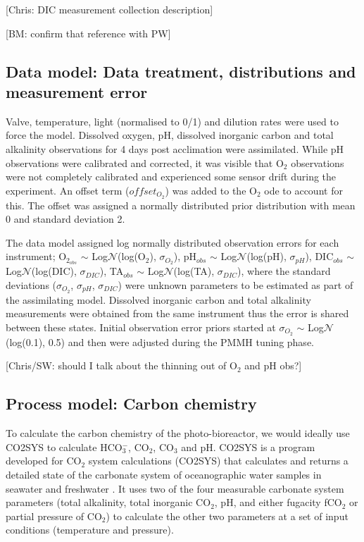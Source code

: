 \documentclass{ruthesis}
\begin{document}
[Chris: DIC measurement collection description]

[BM: confirm that reference with PW]


\subsection{Data model: Data treatment, distributions and measurement error}

Valve, temperature, light (normalised to 0/1) and dilution rates were used to force the model.
Dissolved oxygen, pH, dissolved inorganic carbon and total alkalinity observations for 4 days post acclimation were assimilated. 
While pH observations were calibrated and corrected, it was visible that O$_2$ observations were not completely calibrated and experienced some sensor drift during the experiment. An offset term ($offset_{O_2}$) was added to the O$_2$ ode to account for this. The offset was assigned a normally distributed prior distribution with mean 0 and standard deviation 2. 

The data model assigned log normally distributed observation errors for each instrument;
O$_{2_{obs}}$ $\sim$ Log$\mathcal{N}$(log(O$_2$), $\sigma_{O_2}$), pH$_{obs}$ $\sim$ Log$\mathcal{N}$(log(pH),  $\sigma_{pH}$), DIC$_{obs}$ $\sim$ Log$\mathcal{N}$(log(DIC), $\sigma_{DIC}$), TA$_{obs}$ $\sim$ Log$\mathcal{N}$(log(TA), $\sigma_{DIC}$), where the standard deviations ($\sigma_{O_2}$, $\sigma_{pH}$, $\sigma_{DIC}$) were unknown parameters to be estimated as part of the assimilating model. Dissolved inorganic carbon and total alkalinity measurements were obtained from the same instrument thus the error is shared between these states. Initial observation error priors started at $\sigma_{O_2}$ $\sim$ Log$\mathcal{N}$(log(0.1), 0.5) and then were adjusted during the PMMH tuning phase. 


[Chris/SW: should I talk about the thinning out of O$_2$ and pH obs?]


\subsection{Process model: Carbon chemistry}

To calculate the carbon chemistry of the photo-bioreactor, we would ideally use CO2SYS \cite{lewis1998program} to calculate HCO$_3^-$, CO$_2$, CO$_3$ and pH. 
CO2SYS is a program developed for CO$_2$ system calculations (CO2SYS) that calculates and returns a detailed state of the carbonate system of oceanographic water samples in seawater and freshwater \cite{lewis1998program}.
It uses two of the four measurable carbonate system parameters (total alkalinity, total inorganic CO$_2$, pH, and either fugacity fCO$_2$ or partial pressure of CO$_2$) to calculate the other two parameters at a set of input conditions (temperature and pressure). 
\end{document}
